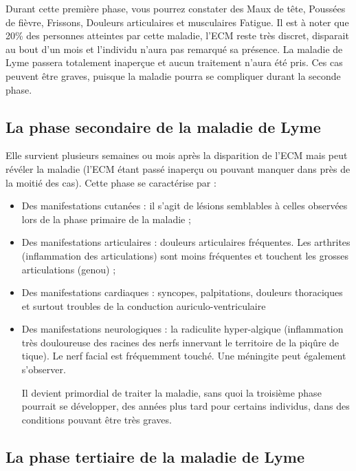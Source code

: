 \documentclass[12pt,a4wide]{article}
\begin{document}
Durant cette première phase, vous pourrez constater des Maux de tête, Poussées de fièvre, Frissons, Douleurs articulaires et musculaires Fatigue.
Il est à noter que 20\% des personnes atteintes par cette maladie, l'ECM reste très discret, disparait au bout d'un mois et l'individu n'aura pas remarqué sa présence. La maladie de Lyme passera totalement inaperçue et aucun traitement n'aura été pris. Ces cas peuvent être graves, puisque la maladie pourra se compliquer durant la seconde phase.



\subsection{La phase secondaire de la maladie de Lyme}
\label{sec-3-2}

Elle survient plusieurs semaines ou mois après la disparition de l'ECM mais peut révéler la maladie (l'ECM étant passé inaperçu ou pouvant manquer dans près de la moitié des cas). Cette phase se caractérise par :
\begin{itemize}
\item Des manifestations cutanées : il s'agit de lésions semblables à celles observées lors de la phase primaire de la maladie ;
\item Des manifestations articulaires : douleurs articulaires fréquentes. Les arthrites (inflammation des articulations) sont moins fréquentes et touchent les grosses articulations (genou) ;
\item Des manifestations cardiaques : syncopes, palpitations, douleurs thoraciques et surtout troubles de la conduction auriculo-ventriculaire

\item Des manifestations neurologiques : la radiculite hyper-algique (inflammation très douloureuse des racines des nerfs innervant le territoire de la piqûre de tique). Le nerf facial est fréquemment touché. Une méningite peut également s'observer. 

Il devient primordial de traiter la maladie, sans quoi la troisième phase pourrait se développer, des années plus tard pour certains individus, dans des conditions pouvant être très graves.
\end{itemize}


\subsection{La phase tertiaire de la maladie de Lyme}
\label{sec-3-3}
\end{document}
